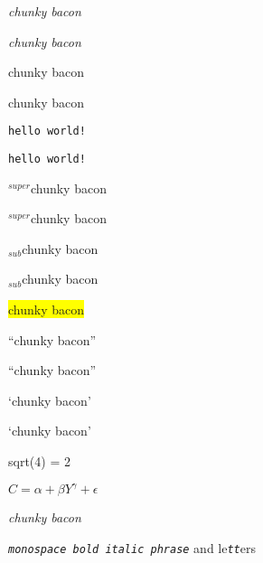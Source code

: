 
\emph{chunky bacon}

\emph{chunky bacon}

chunky bacon

chunky bacon

{\tt hello world!}

{\tt hello world!}

${}^{super}$chunky bacon

${}^{super}$chunky bacon

${}_{sub}$chunky bacon

${}_{sub}$chunky bacon

\colorbox{yellow}{ chunky bacon}

``chunky bacon''

``chunky bacon''

`chunky bacon'

`chunky bacon'

sqrt(4) = 2

$C = \alpha + \beta Y^{\gamma} + \epsilon$

\emph{chunky bacon}

{\tt \emph{monospace bold italic phrase}} and le{\tt \emph{tt}}ers
